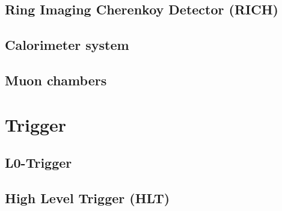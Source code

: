 \subsection{Ring Imaging Cherenkoy Detector (RICH)}

\subsection{Calorimeter system}

\subsection{Muon chambers}

\section{Trigger}

\subsection{L0-Trigger}

\subsection{High Level Trigger (HLT)}
